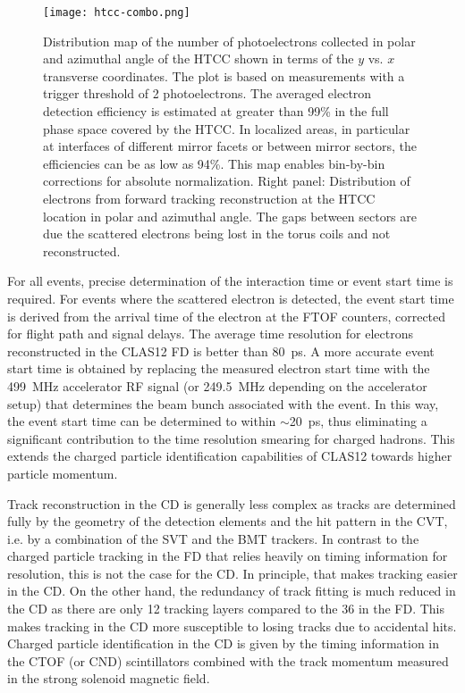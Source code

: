 \documentclass[final,3p,twocolumn]{elsarticle}
\begin{document}
\begin{figure}[t!]
\centerline{\texttt{[image: htcc-combo.png]}}
\caption{Distribution map of the number of photoelectrons collected in polar and azimuthal angle of the HTCC shown
  in terms of the $y$ vs. $x$ transverse coordinates. The plot is based on measurements with a trigger threshold of
  2 photoelectrons. The averaged electron detection efficiency is estimated at greater than 99\% in the full phase
  space covered by the HTCC. In localized areas, in particular at interfaces of different mirror facets or between
  mirror sectors, the efficiencies can be as low as 94\%. This map enables bin-by-bin corrections for absolute
  normalization. Right panel: Distribution of electrons from forward tracking reconstruction at the HTCC location in
  polar and azimuthal angle. The gaps between sectors are due the scattered electrons being lost in the torus coils and
  not reconstructed.}
\label{htcc-performance} 
\end{figure}

For all events, precise determination of the interaction time or event start time is required. For events where the
scattered electron is detected, the event start time is derived from the arrival time of the electron at the FTOF
counters, corrected for flight path and signal delays.  The average time resolution for electrons reconstructed in
the CLAS12 FD is better than 80~ps. A more accurate event start time is obtained by replacing the measured
electron start time with the 499~MHz accelerator RF signal (or 249.5~MHz depending on the accelerator setup)
that determines the beam bunch associated with the event. In this way, the event start time can be determined to
within $\sim$20~ps, thus eliminating a significant contribution to the time resolution smearing for charged hadrons.
This extends the charged particle identification capabilities of CLAS12 towards higher particle momentum.

Track reconstruction in the CD is generally less complex as tracks are determined fully by the geometry of the 
detection elements and the hit pattern in the CVT, i.e. by a combination of the SVT and the BMT trackers.  In
contrast to the charged particle tracking in the FD that relies heavily on timing information for resolution, this
is not the case for the CD. In principle, that makes tracking easier in the CD. On the other hand, the redundancy
of track fitting is much reduced in the CD as there are only 12 tracking layers compared to the 36 in the FD. This
makes tracking in the CD more susceptible to losing tracks due to accidental hits. Charged particle identification
in the CD is given by the timing information in the CTOF (or CND) scintillators combined with the track momentum
measured in the strong solenoid magnetic field.
\end{document}
